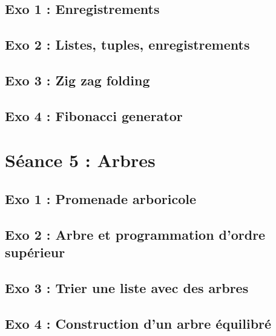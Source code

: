 \subsection{Exo 1 : Enregistrements}


\subsection{Exo 2 : Listes, tuples, enregistrements}


\subsection{Exo 3 : Zig zag folding}


\subsection{Exo 4 : Fibonacci generator}












\newpage
\section{Séance 5 : Arbres}

\subsection{Exo 1 : Promenade arboricole}


\subsection{Exo 2 : Arbre et programmation d'ordre supérieur}


\subsection{Exo 3 : Trier une liste avec des arbres}


\subsection{Exo 4 : Construction d'un arbre équilibré}







